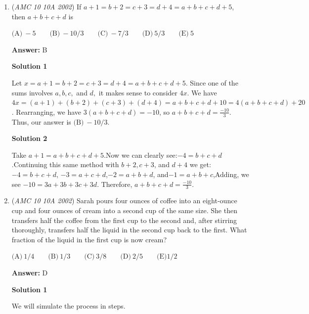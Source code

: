 \begin{enumerate}
 (Note that we did not need to actually construct the primes. If we had to, we could match the tens and ones digits to form sets of four primes such as: $23$, $41$, $59$, and $67$ or $29$, $41$, $53$, and $67$.)

 (You could also guess the numbers, if you have a lot of spare time.)

 


	\item (\textit{AMC 10 10A 2002}) If $a + 1 = b + 2 = c + 3 = d + 4 = a + b + c + d + 5$, then $a + b + c + d$ is


 $\text{(A)}\ -5 \qquad \text{(B)}\ -10/3 \qquad \text{(C)}\ -7/3 \qquad \text{(D)}\ 5/3 \qquad \text{(E)}\ 5$

 \textbf{Answer: }B



\textbf{Solution 1}

Let $x=a + 1 = b + 2 = c + 3 = d + 4 = a + b + c + d + 5$. Since one of the sums involves $a, b, c,$ and $d,$ it makes sense to consider $4x$. We have $4x=(a+1)+(b+2)+(c+3)+(d+4)=a+b+c+d+10=4(a+b+c+d)+20$. Rearranging, we have $3(a+b+c+d)=-10$, so $a+b+c+d=\frac{-10}{3}$. Thus, our answer is $\boxed{\text{(B)}\ -10/3}$.

 



\textbf{Solution 2}

Take $a + 1 = a + b + c + d + 5$.Now we can clearly see:$-4 = b + c + d$.Continuing this same method with $b + 2, c + 3$, and $d + 4$ we get:$-4 = b + c + d$, $-3 = a + c + d$,$-2 = a + b + d$, and$-1 = a + b + c$,Adding, we see $-10 = 3a + 3b + 3c + 3d$. Therefore, $a + b + c + d = \boxed{\frac{-10}{3}}$.

 


	\item (\textit{AMC 10 10A 2002}) Sarah pours four ounces of coffee into an eight-ounce cup and four ounces of cream into a second cup of the same size. She then transfers half the coffee from the first cup to the second and, after stirring thoroughly, transfers half the liquid in the second cup back to the first. What fraction of the liquid in the first cup is now cream?


 $\text{(A)}\ 1/4 \qquad \text{(B)}\ 1/3 \qquad \text{(C)}\ 3/8 \qquad \text{(D)}\ 2/5 \qquad \text{(E)} 1/2$

 \textbf{Answer: }D



\textbf{Solution 1}

We will simulate the process in steps.


\end{enumerate}
